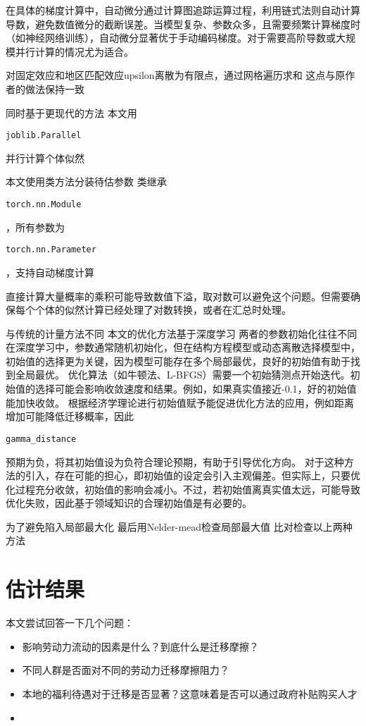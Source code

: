 \documentclass[a4paper,10pt]{article}
\begin{document}
在具体的梯度计算中，自动微分通过计算图追踪运算过程，利用链式法则自动计算导数，避免数值微分的截断误差。当模型复杂、参数众多，且需要频繁计算梯度时（如神经网络训练），自动微分显著优于手动编码梯度。对于需要高阶导数或大规模并行计算的情况尤为适合。

对固定效应和地区匹配效应upsilon离散为有限点，通过网格遍历求和
这点与原作者的做法保持一致

同时基于更现代的方法
本文用\begin{verbatim}joblib.Parallel\end{verbatim}并行计算个体似然

本文使用类方法分装待估参数
类继承\begin{verbatim}torch.nn.Module\end{verbatim}，所有参数为\begin{verbatim}torch.nn.Parameter\end{verbatim}，支持自动梯度计算

直接计算大量概率的乘积可能导致数值下溢，取对数可以避免这个问题。但需要确保每个个体的似然计算已经处理了对数转换，或者在汇总时处理。

与传统的计量方法不同
本文的优化方法基于深度学习
两者的参数初始化往往不同
在深度学习中，参数通常随机初始化，但在结构方程模型或动态离散选择模型中，初始值的选择更为关键，因为模型可能存在多个局部最优，良好的初始值有助于找到全局最优。
优化算法（如牛顿法、L-BFGS）需要一个初始猜测点开始迭代。初始值的选择可能会影响收敛速度和结果。例如，如果真实值接近-0.1，好的初始值能加快收敛。
根据经济学理论进行初始值赋予能促进优化方法的应用，例如距离增加可能降低迁移概率，因此\begin{verbatim}gamma_distance\end{verbatim}预期为负，将其初始值设为负符合理论预期，有助于引导优化方向。
对于这种方法的引入，存在可能的担心，即初始值的设定会引入主观偏差。但实际上，只要优化过程充分收敛，初始值的影响会减小。不过，若初始值离真实值太远，可能导致优化失败，因此基于领域知识的合理初始值是有必要的。


为了避免陷入局部最大化
最后用Nelder-mead检查局部最大值
比对检查以上两种方法

\section{估计结果}

本文尝试回答一下几个问题：
\begin{itemize}
  \item 影响劳动力流动的因素是什么？到底什么是迁移摩擦？
  \item 不同人群是否面对不同的劳动力迁移摩擦阻力？
  \item 本地的福利待遇对于迁移是否显著？这意味着是否可以通过政府补贴购买人才
  \item 
\end{itemize}
\end{document}
